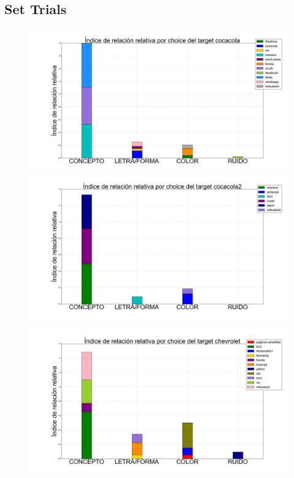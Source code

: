 \documentclass{beamer}
\begin{document}
\begin{frame}
\begin{figure}[h]
\begin{minipage}[c]{1\textwidth}
  \end{minipage}
\end{figure}
\end{frame}

\subsection{Set Trials}

\begin{frame}
\begin{figure}[h]
 \centering
  \begin{minipage}[c]{1\textwidth}
	\includegraphics[scale=0.108]{cocacola.png}
	\includegraphics[scale=0.108]{cocacola2.png}
  \end{minipage}
  \begin{minipage}[c]{1\textwidth}
	\includegraphics[scale=0.108]{chevrolet.png}

\end{minipage}
\end{figure}
\end{frame}
\end{document}
